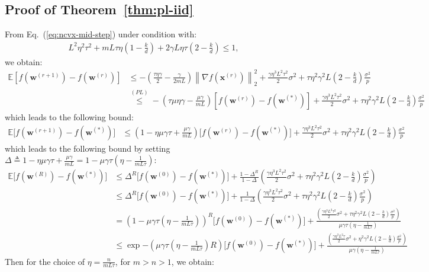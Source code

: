 \subsection{Proof of Theorem~\ref{thm:pl-iid}}
From Eq.~(\ref{eq:ncvx-mid-step}) under condition with:
\begin{align}
       L^2\eta^2\tau^2+mL\tau\eta\left(1-\frac{k}{d}\right)+2\gamma L\eta\tau\left(2-\frac{k}{d}\right)\leq 1, 
\end{align}
we obtain:
\begin{align}
         \mathbb{E}\left[f({\boldsymbol{w}}^{(r+1)})-f({\boldsymbol{w}}^{(r)})\right]&\leq -\left(\frac{\tau\eta\gamma}{2}-\frac{\gamma}{2mL}\right)\left\|\nabla f({\boldsymbol{x}}^{(r)})\right\|_2^2+\frac{\gamma\eta^3L^2\tau^2}{2}\sigma^2+\tau\eta^2\gamma^2 L\left(2-\frac{k}{d}\right)\frac{\sigma^2}{p}\nonumber\\
         &\stackrel{(PL)}{\leq} -\left({\tau\mu\eta\gamma}-\frac{\mu\gamma}{mL}\right)\left[f({\boldsymbol{w}}^{(r)})-f({\boldsymbol{w}}^{(*)})\right]+\frac{\gamma\eta^3L^2\tau^2}{2}\sigma^2+\tau\eta^2\gamma^2 L\left(2-\frac{k}{d}\right)\frac{\sigma^2}{p} 
\end{align}
which leads to the following bound:
\begin{align}
            \mathbb{E}\Big[f({\boldsymbol{w}}^{(r+1)})-f({\boldsymbol{w}}^{(*)})\Big]&\leq \left(1-\eta\mu\gamma{\tau}+\frac{\mu\gamma}{mL}\right) \Big[f({\boldsymbol{w}}^{(r)})-f({\boldsymbol{w}}^{(*)})\Big]+\frac{\gamma\eta^3L^2\tau^2}{2}\sigma^2+\tau\eta^2\gamma^2 L\left(2-\frac{k}{d}\right)\frac{\sigma^2}{p} 
\end{align}
which leads to the following bound by setting $\Delta\triangleq1-\eta\mu\gamma{\tau}+\frac{\mu\gamma}{mL}=1-\mu\gamma\tau\left(\eta-\frac{1}{mL\tau}\right)$:
\begin{align}
            \mathbb{E}\Big[f({\boldsymbol{w}}^{(R)})-f({\boldsymbol{w}}^{(*)})\Big]&\leq \Delta^R \Big[f({\boldsymbol{w}}^{(0)})-f({\boldsymbol{w}}^{(*)})\Big]+\frac{1-\Delta^R}{1-\Delta}\left(\frac{\gamma\eta^3L^2\tau^2}{2}\sigma^2+\tau\eta^2\gamma^2 L\left(2-\frac{k}{d}\right)\frac{\sigma^2}{p} \right)\nonumber\\
            &\leq \Delta^R \Big[f({\boldsymbol{w}}^{(0)})-f({\boldsymbol{w}}^{(*)})\Big]+\frac{1}{1-\Delta}\left(\frac{\gamma\eta^3L^2\tau^2}{2}\sigma^2+\tau\eta^2\gamma^2 L\left(2-\frac{k}{d}\right)\frac{\sigma^2}{p} \right)\nonumber\\
            &={\left(1-\mu\gamma\tau\left(\eta-\frac{1}{mL\tau}\right)\right)}^R \Big[f({\boldsymbol{w}}^{(0)})-f({\boldsymbol{w}}^{(*)})\Big]+\frac{\left(\frac{\gamma\eta^3L^2\tau^2}{2}\sigma^2+\tau\eta^2\gamma^2 L\left(2-\frac{k}{d}\right)\frac{\sigma^2}{p} \right)}{\mu\gamma\tau\left(\eta-\frac{1}{m L\tau}\right)}\nonumber\\
            &\leq \exp{-\left(\mu\gamma\tau\left(\eta-\frac{1}{m L\tau}\right)R\right)}\Big[f({\boldsymbol{w}}^{(0)})-f({\boldsymbol{w}}^{(*)})\Big]+\frac{\left(\frac{\gamma\eta^3L^2\tau}{2}\sigma^2+\eta^2\gamma^2 L\left(2-\frac{k}{d}\right)\frac{\sigma^2}{p} \right)}{\mu\gamma\left(\eta-\frac{1}{mL\tau}\right)}
\end{align}
Then for the choice of $\eta=\frac{n}{mL\tau}$, for $m>n>1$, we obtain:



